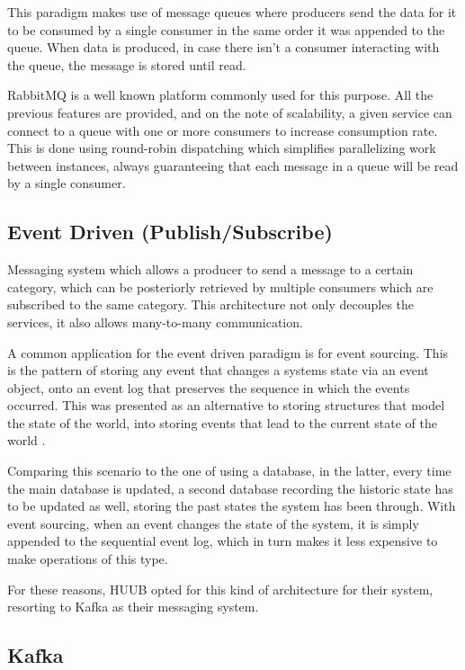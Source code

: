 This paradigm makes use of message queues where producers send the data for it to be consumed by a single consumer in the same order it was appended to the queue. When data is produced, in case there isn’t a consumer interacting with the queue, the message is stored until read. 

RabbitMQ is a well known platform commonly used for this purpose. All the previous features are provided, and on the note of scalability, a given service can connect to a queue with one or more consumers to increase consumption rate. This is done using round-robin dispatching \cite{RabbitMQscale} which simplifies parallelizing work between instances, always guaranteeing that each message in a queue will be read by a single consumer.

\subsection{Event Driven (Publish/Subscribe)}

Messaging system which allows a producer to send a message to a certain category, which can be posteriorly retrieved by multiple consumers which are subscribed to the same category. This architecture not only decouples the services, it also allows many-to-many communication.

A common application for the event driven paradigm is for event sourcing. This is the pattern of storing any event that changes a systems state via an event object, onto an event log that preserves the sequence in which the events occurred. This was presented as an alternative to storing structures that model the state of the world, into storing events that lead to the current state of the world \cite[Chapter~5]{nadareishvili2016microservice}.

Comparing this scenario to the one of using a database, in the latter, every time the main database is updated, a second database recording the historic state has to be updated as well, storing the past states the system has been through. With event sourcing, when an event changes the state of the system, it is simply appended to the sequential event log, which in turn makes it less expensive to make operations of this type.

For these reasons, HUUB opted for this kind of architecture for their system, resorting to Kafka as their messaging system. 

\subsection{Kafka}

